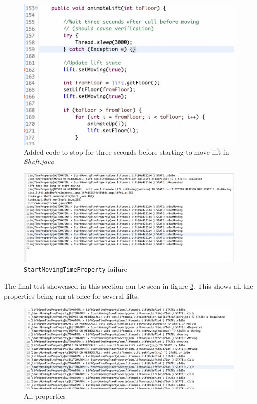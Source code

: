 \documentclass[a4paper, 12pt]{article}
\begin{document}
\begin{figure}[h]
   \centering
   \includegraphics[width=\textwidth,height=\textheight,keepaspectratio]{images/start-moving-time-property-failure-edit} %
   \caption{Added code to stop for three seconds before starting to move lift in \textit{Shaft.java}}
   \label{fig:start-moving-time-property-failure-edit}
\end{figure}

\begin{figure}[h]
   \centering
   \includegraphics[width=\textwidth,height=\textheight,keepaspectratio]{images/start-moving-time-property-failed} %
   \caption{\texttt{StartMovingTimeProperty} failure}
   \label{fig:start-moving-time-property-failed}
\end{figure}

The final test showcased in this section can be seen in figure \ref{fig:all-properties}. This shows all the properties being run at once for several lifts. 

\begin{figure}[h]
   \centering
   \includegraphics[width=\textwidth,height=\textheight,keepaspectratio]{images/all-properties} %
   \caption{All properties}
   \label{fig:all-properties}
\end{figure}
\end{document}
